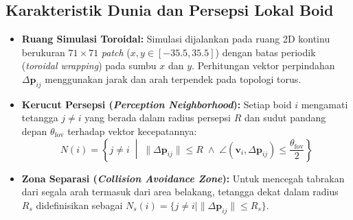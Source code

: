 \documentclass[11pt,a4paper]{article}
\begin{document}
\subsection*{Karakteristik Dunia dan Persepsi Lokal Boid}
\begin{itemize}
    \item \textbf{Ruang Simulasi Toroidal:} Simulasi dijalankan pada ruang 2D kontinu berukuran $71 \times 71$ \textit{patch} ($x, y \in [-35.5, 35.5]$) dengan batas periodik (\textit{toroidal wrapping}) pada sumbu $x$ dan $y$. Perhitungan vektor perpindahan $\Delta \mathbf{p}_{ij}$ menggunakan jarak dan arah terpendek pada topologi torus.
    \item \textbf{Kerucut Persepsi (\textit{Perception Neighborhood}):} Setiap boid $i$ mengamati tetangga $j \neq i$ yang berada dalam radius persepsi $R$ dan sudut pandang depan $\theta_{\text{fov}}$ terhadap vektor kecepatannya:
    \[
        N(i) = \left\{ j \neq i \;\middle|\; \|\Delta \mathbf{p}_{ij}\| \le R \;\land\; \angle(\mathbf{v}_i, \Delta \mathbf{p}_{ij}) \le \frac{\theta_{\text{fov}}}{2} \right\}
    \]
    \item \textbf{Zona Separasi (\textit{Collision Avoidance Zone}):} Untuk mencegah tabrakan dari segala arah termasuk dari area belakang, tetangga dekat dalam radius $R_s$ didefinisikan sebagai $N_s(i) = \{ j \neq i \mid \|\Delta \mathbf{p}_{ij}\| \le R_s \}$.
\end{itemize}
\end{document}
